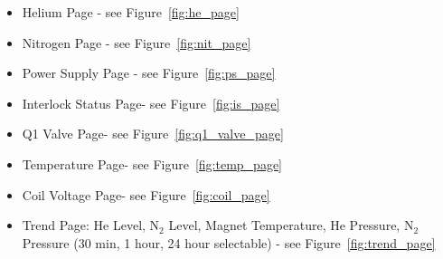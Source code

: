 \begin{itemize}
\item{Helium Page - see Figure~\ref{fig:he_page}}
\item{Nitrogen Page - see Figure~\ref{fig:nit_page}}
\item{Power Supply Page - see Figure~\ref{fig:ps_page}}
\item{Interlock Status Page- see Figure~\ref{fig:is_page}}
\item{Q1 Valve Page- see Figure~\ref{fig:q1_valve_page}}
\item{Temperature Page- see Figure~\ref{fig:temp_page}}
\item{Coil Voltage Page- see Figure~\ref{fig:coil_page}}
\item{Trend Page: He Level, N$_2$ Level, Magnet Temperature, He Pressure,
N$_2$ Pressure (30 min, 1 hour, 24 hour selectable) - see Figure~\ref{fig:trend_page}}
\end{itemize}

